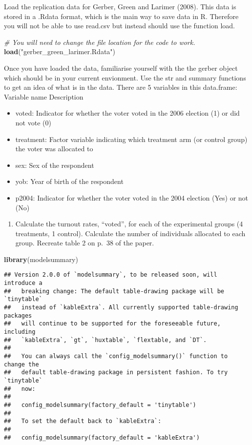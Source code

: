 \documentclass[
]{article}
\newenvironment{Shaded}{\begin{snugshade}}{\end{snugshade}}
\newcommand{\CommentTok}[1]{\textcolor[rgb]{0.56,0.35,0.01}{\textit{#1}}}
\newcommand{\FunctionTok}[1]{\textcolor[rgb]{0.13,0.29,0.53}{\textbf{#1}}}
\newcommand{\NormalTok}[1]{#1}
\newcommand{\StringTok}[1]{\textcolor[rgb]{0.31,0.60,0.02}{#1}}
\providecommand{\tightlist}{%
  \setlength{\itemsep}{0pt}\setlength{\parskip}{0pt}}
\begin{document}
Load the replication data for Gerber, Green and Larimer (2008). This
data is stored in a .Rdata format, which is the main way to save data in
R. Therefore you will not be able to use read.csv but instead should use
the function load.

\begin{Shaded}
\begin{Highlighting}[]
\CommentTok{\# You will need to change the file location for the code to work.}
\FunctionTok{load}\NormalTok{(}\StringTok{"gerber\_green\_larimer.Rdata"}\NormalTok{)}
\end{Highlighting}
\end{Shaded}

Once you have loaded the data, familiarise yourself with the the gerber
object which should be in your current envionment. Use the str and
summary functions to get an idea of what is in the data. There are 5
variables in this data.frame: Variable name Description

\begin{itemize}
\tightlist
\item
  voted: Indicator for whether the voter voted in the 2006 election (1)
  or did not vote (0)
\item
  treatment: Factor variable indicating which treatment arm (or control
  group) the voter was allocated to
\item
  sex: Sex of the respondent
\item
  yob: Year of birth of the respondent
\item
  p2004: Indicator for whether the voter voted in the 2004 election
  (Yes) or not (No)
\end{itemize}

\begin{enumerate}
\def\labelenumi{\arabic{enumi}.}
\tightlist
\item
  Calculate the turnout rates, ``voted'', for each of the experimental
  groups (4 treatments, 1 control). Calculate the number of individuals
  allocated to each group. Recreate table 2 on p.~38 of the paper.
\end{enumerate}

\begin{Shaded}
\begin{Highlighting}[]
\FunctionTok{library}\NormalTok{(modelsummary)}
\end{Highlighting}
\end{Shaded}

\begin{verbatim}
## Version 2.0.0 of `modelsummary`, to be released soon, will introduce a
##   breaking change: The default table-drawing package will be `tinytable`
##   instead of `kableExtra`. All currently supported table-drawing packages
##   will continue to be supported for the foreseeable future, including
##   `kableExtra`, `gt`, `huxtable`, `flextable, and `DT`.
##   
##   You can always call the `config_modelsummary()` function to change the
##   default table-drawing package in persistent fashion. To try `tinytable`
##   now:
##   
##   config_modelsummary(factory_default = 'tinytable')
##   
##   To set the default back to `kableExtra`:
##   
##   config_modelsummary(factory_default = 'kableExtra')
\end{verbatim}
\end{document}
